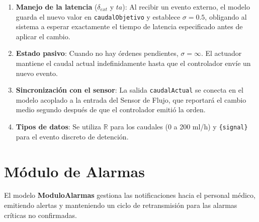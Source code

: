 \documentclass[12pt, a4paper]{article}
\begin{document}
\begin{enumerate}
    \item \textbf{Manejo de la latencia} ($\delta_{\mathit{ext}}$ y $\mathit{ta}$): Al recibir
    un evento externo, el modelo guarda el nuevo valor en \texttt{caudalObjetivo} y
    establece $\sigma = 0.5$, obligando al sistema a esperar exactamente el tiempo
    de latencia especificado antes de aplicar el cambio.

    \item \textbf{Estado pasivo}: Cuando no hay órdenes pendientes, $\sigma = \infty$.
    El actuador mantiene el caudal actual indefinidamente hasta que el controlador
    envíe un nuevo evento.

    \item \textbf{Sincronización con el sensor}: La salida \texttt{caudalActual} se
    conecta en el modelo acoplado a la entrada del Sensor de Flujo, que reportará
    el cambio medio segundo después de que el controlador emitió la orden.

    \item \textbf{Tipos de datos}: Se utiliza $\mathbb{R}$ para los caudales
    (0 a 200 ml/h) y \texttt{\{signal\}} para el evento discreto de detención.
\end{enumerate}
\section{Módulo de Alarmas}

El modelo \textbf{ModuloAlarmas} gestiona las notificaciones hacia el personal médico,
emitiendo alertas y manteniendo un ciclo de retransmisión para las alarmas críticas
no confirmadas.
\end{document}
